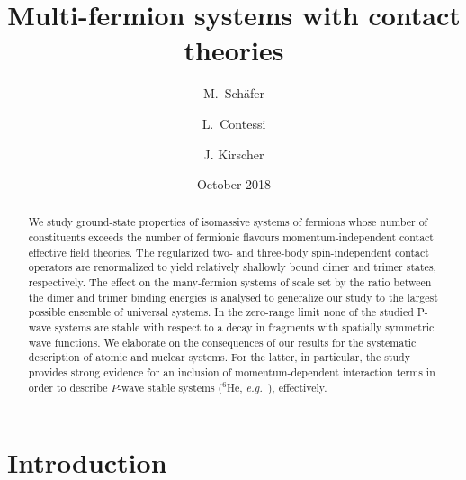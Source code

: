 \documentclass[preprint,12pt]{elsarticle}
\newcommand{\eg}{\textit{e.g.}~}
\begin{document}
\title{Multi-fermion systems with contact theories}
\author{M.~Sch{\"a}fer }%
\address{Czech Technical University in Prague, Faculty of Nuclear Sciences 
and Physical Engineering, B\v{r}ehov\'{a} 7, 11519 Prague 1, Czech Republic} 
\author{L.~Contessi } 
\address{Racah Institute of Physics, The Hebrew university, 91904 Jerusalem, 
Israel} 
\address{ESNT, IRFU, CEA, Universite Paris Saclay, F-91191 Gif-sur-Yvette, France} 
\author{J. Kirscher }%
\address{Theoretical Physics Division, School of Physics and Astronomy,
The University of Manchester, Manchester, M13 9PL, United Kingdom} 
\date{October 2018}


\begin{abstract}We study ground-state properties of isomassive systems of fermions
whose number of constituents exceeds  the number of fermionic flavours
momentum-independent contact effective field theories.
The regularized two- and three-body spin-independent contact operators are
renormalized to yield relatively shallowly bound dimer and trimer states, respectively.
The effect on the many-fermion systems of scale set by the ratio between the dimer
and trimer binding energies is analysed to generalize our study to the largest
possible ensemble of universal systems.
In the zero-range limit none of the studied P-wave systems are stable with respect to
a decay in fragments with spatially symmetric wave functions.
We elaborate on the consequences of our results for the systematic description of
atomic and nuclear systems. For the latter, in particular, the study provides
strong evidence for an inclusion of momentum-dependent interaction terms in order
to describe $P$-wave stable systems ($^6$He, \eg), effectively.
\end{abstract}

\maketitle



\newpage
\section{Introduction}
\end{document}
